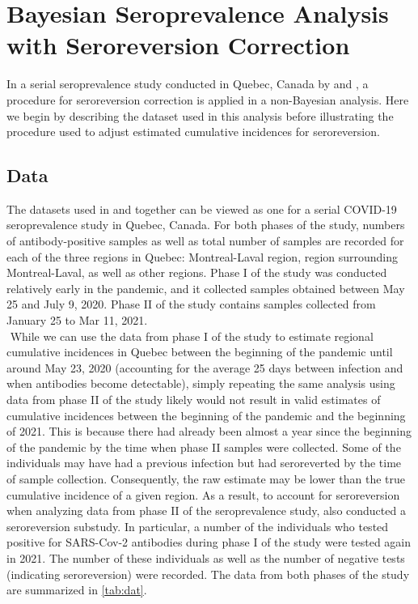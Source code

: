 \section{Bayesian Seroprevalence Analysis with Seroreversion Correction}
In a serial seroprevalence study conducted in Quebec, Canada by \cite{lewin2021sars} and \cite{lewin2022seroprevalence}, a procedure for seroreversion correction is applied in a non-Bayesian analysis. Here we begin by describing the dataset used in this analysis before illustrating the procedure used to adjust estimated cumulative incidences for seroreversion.
\subsection{Data}
The datasets used in \cite{lewin2021sars} and \cite{lewin2022seroprevalence} together can be viewed as one for a serial COVID-19 seroprevalence study in Quebec, Canada. For both phases of the study, numbers of antibody-positive samples as well as total number of samples are recorded for each of the three regions in Quebec: Montreal-Laval region, region surrounding Montreal-Laval, as well as other regions. Phase I of the study was conducted relatively early in the pandemic, and it collected samples obtained between May 25 and July 9, 2020. Phase II of the study contains samples collected from  January 25 to Mar 11, 2021.\\
\newline $ $
While we can use the data from phase I of the study to estimate regional cumulative incidences in Quebec between the beginning of the pandemic until around May 23, 2020 (accounting for the average 25 days between infection and when antibodies become detectable), simply repeating the same analysis using data from phase II of the study likely would not result in valid estimates of cumulative incidences between the beginning of the pandemic and the beginning of 2021. This is because there had already been almost a year since the beginning of the pandemic by the time when phase II samples were collected. Some of the individuals may have had a previous infection but had seroreverted by the time of sample collection. Consequently, the raw estimate may be lower than the true cumulative incidence of a given region. As a result, to account for seroreversion when analyzing data from phase II of the seroprevalence study, \cite{lewin2022seroprevalence} also conducted a seroreversion substudy. In particular, a number of the individuals who tested positive for SARS-Cov-2 antibodies during phase I of the study were tested again in 2021. The number of these individuals as well as the number of negative tests (indicating seroreversion) were recorded. The data from both phases of the study are summarized in \cref{tab:dat}.\\
